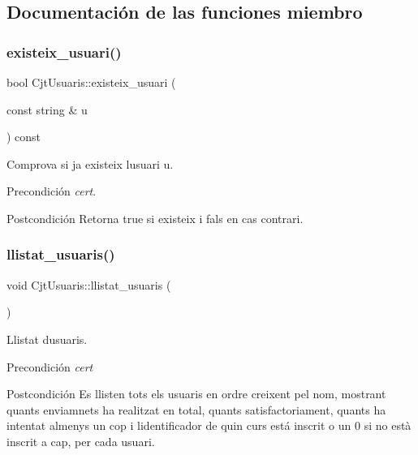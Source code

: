 \subsection{Documentación de las funciones miembro}
\mbox{\label{class_cjt_usuaris_a0d3f318f95ecfdae0f7420113cc73ab0}} 
\subsubsection{\texorpdfstring{existeix\+\_\+usuari()}{existeix\_usuari()}}
{\footnotesize\ttfamily bool Cjt\+Usuaris\+::existeix\+\_\+usuari (\begin{DoxyParamCaption}\item[{const string \&}]{u }\end{DoxyParamCaption}) const}



Comprova si ja existeix l\textquotesingle{}usuari u. 

\begin{DoxyPrecond}{Precondición}
{\itshape cert}. 
\end{DoxyPrecond}
\begin{DoxyPostcond}{Postcondición}
Retorna true si existeix i fals en cas contrari. 
\end{DoxyPostcond}
\mbox{\label{class_cjt_usuaris_a28020e6e834b3c483198285fb35436fc}} 
\subsubsection{\texorpdfstring{llistat\+\_\+usuaris()}{llistat\_usuaris()}}
{\footnotesize\ttfamily void Cjt\+Usuaris\+::llistat\+\_\+usuaris (\begin{DoxyParamCaption}{ }\end{DoxyParamCaption})}



Llistat d\textquotesingle{}usuaris. 

\begin{DoxyPrecond}{Precondición}
{\itshape cert} 
\end{DoxyPrecond}
\begin{DoxyPostcond}{Postcondición}
Es llisten tots els usuaris en ordre creixent pel nom, mostrant quants enviamnets ha realitzat en total, quants satisfactoriament, quants ha intentat almenys un cop i l\textquotesingle{}identificador de quin curs está inscrit o un 0 si no està inscrit a cap, per cada usuari. 
\end{DoxyPostcond}
\mbox{\label{class_cjt_usuaris_a01e702bce964b2a96af36fcd9a820b74}} 
